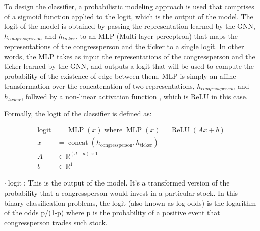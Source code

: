 \documentclass[15pt,letterpaper]{article}
\begin{document}
To design the classifier, a probabilistic modeling approach is used that comprises of a sigmoid function applied to the logit, which is the output of the model. The logit of the model is obtained by passing the representation learned by the GNN, $h_{congressperson}$ and $h_{ticker}$, to an MLP (Multi-layer perceptron) \citep{Gardner1998ArtificialNN, 7103337} that maps the representations of the congressperson and the ticker to a single logit. In other words, the MLP takes as input the representations of the congressperson and the ticker learned by the GNN, and outputs a logit that will be used to compute the probability of the existence of edge between them. MLP is simply an affine transformation over the concatenation of two representations, $h_{congressperson}$ and $h_{ticker}$, follwed by a non-linear activation function \citep{nonl}, which is ReLU \citep{relu} in this case.

Formally, the logit of the classifier is defined as:


\begin{align*}
  \operatorname{logit} &= \operatorname{MLP}\left(x\right) \operatorname{ where } \operatorname{MLP}(x) = \operatorname{ReLU}(Ax + b) \\
  x &= \operatorname{concat}\left(h_{\text{congressperson}}, h_{\text{ticker}}\right) \\
  A &\in \mathbb{R}^{(d+d) \times 1} \\
  b &\in \mathbb{R}^{1}
\end{align*}
  
  $\boldsymbol{\cdot}\operatorname{logit}$: This is the output of the model. It's a transformed version of the probability that a congressperson would invest in a particular stock. In this binary classification problems, the logit (also known as log-odds) is the logarithm of the odds p/(1-p) where p is the probability of a positive event that congressperson trades such stock.
  
\end{document}
